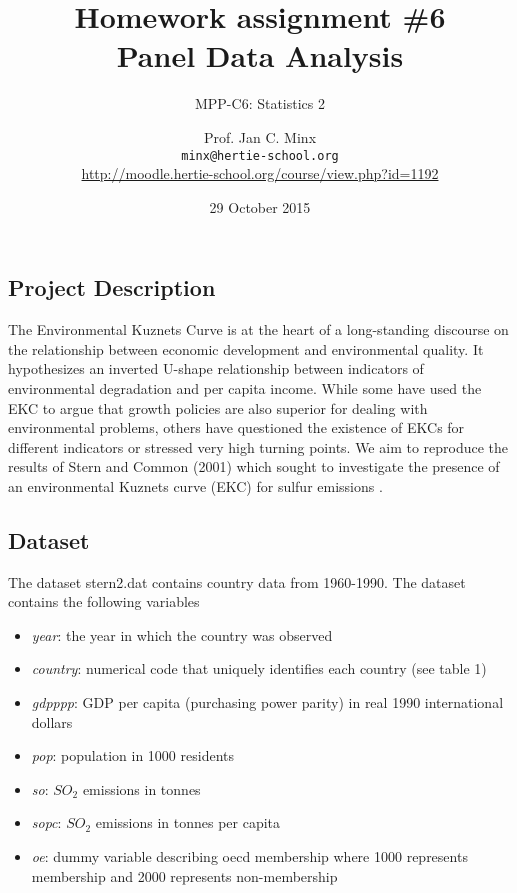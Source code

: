 \documentclass{scrartcl}
\begin{document}
	\title{Homework assignment \#6\\ Panel Data Analysis}
	\subtitle{MPP-C6: Statistics 2}
	\author{Prof. Jan C. Minx\\ \texttt{minx@hertie-school.org} \\
		\url{http://moodle.hertie-school.org/course/view.php?id=1192}}
	\date{29 October 2015}
	
	\maketitle

	\subsection*{Project Description}
	The Environmental Kuznets Curve is at the heart of a long-standing discourse on the relationship between economic development and environmental quality. It hypothesizes an inverted U-shape relationship between indicators of environmental degradation and per capita income. While some have used the EKC to argue that growth policies are also superior for dealing with environmental problems, others have questioned the existence of EKCs for different indicators or stressed very high turning points. We aim to reproduce the results of Stern and Common (2001) which sought to investigate the presence of an environmental Kuznets curve (EKC) for sulfur emissions \cite{stern2001there}.
	
	\subsection*{Dataset}
	The dataset stern2.dat contains country data from 1960-1990. The dataset contains the following variables
	\begin{itemize}
	\item \textit{year}: the year in which the country was observed 
	\item \textit{country}: numerical code that uniquely identifies each country (see table 1)
	\item \textit{gdpppp}: GDP per capita (purchasing power parity) in real 1990 international dollars
	\item \textit{pop}: population in 1000 residents
	\item \textit{so}: \(SO_2\) emissions in tonnes
	\item \textit{sopc}: \(SO_2\) emissions in tonnes per capita
	\item \textit{oe}: dummy variable describing oecd membership where 1000 represents membership and 2000 represents non-membership
	\end{itemize}
	
\end{document}
